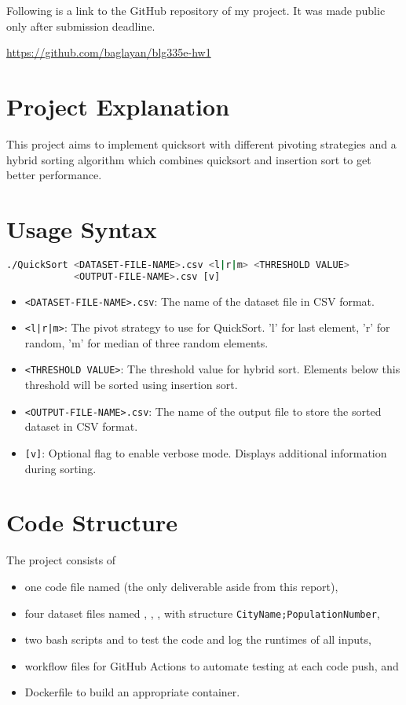 Following is a link to the GitHub repository of my project. It was made public only after submission deadline.

\begin{center}
    \href{https://github.com/baglayan/blg335e-hw1}{https://github.com/baglayan/blg335e-hw1}
\end{center}
\section{Project Explanation}
This project aims to implement quicksort with different pivoting strategies and a hybrid sorting algorithm which combines quicksort and insertion sort to get better performance.

\section{Usage Syntax}
\begin{lstlisting}[language=bash]
./QuickSort <DATASET-FILE-NAME>.csv <l|r|m> <THRESHOLD VALUE>
            <OUTPUT-FILE-NAME>.csv [v]
\end{lstlisting}

\begin{itemize}
    \item \texttt{<DATASET-FILE-NAME>.csv}: The name of the dataset file in CSV format.
    \item \texttt{<l|r|m>}: The pivot strategy to use for QuickSort. 'l' for last element, 'r' for random, 'm' for median of three random elements.
    \item \texttt{<THRESHOLD VALUE>}: The threshold value for hybrid sort. Elements below this threshold will be sorted using insertion sort.
    \item \texttt{<OUTPUT-FILE-NAME>.csv}: The name of the output file to store the sorted dataset in CSV format.
    \item \texttt{[v]}: Optional flag to enable verbose mode. Displays additional information during sorting.
\end{itemize}

\section{Code Structure}
The project consists of
\begin{itemize}
    \item one code file named  (the only deliverable aside from this report),
    \item four dataset files named , , ,  with structure \texttt{CityName;PopulationNumber},
    \item two bash scripts  and  to test the code and log the runtimes of all inputs,
    \item workflow files for GitHub Actions to automate testing at each code push, and
    \item Dockerfile to build an appropriate container.
\end{itemize}

